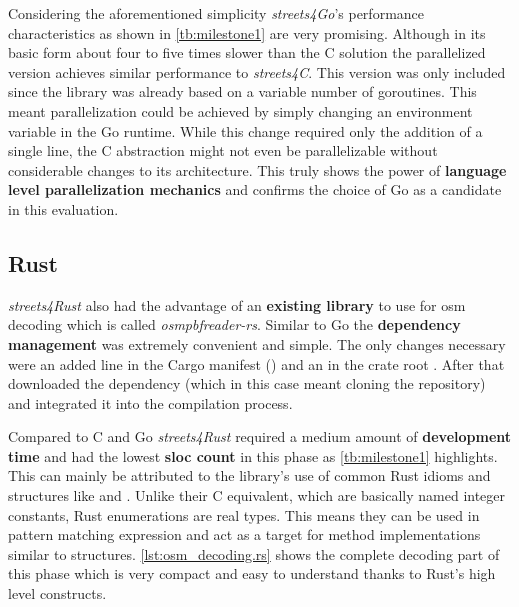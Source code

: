 Considering the aforementioned simplicity \textit{streets4Go}'s performance characteristics as shown in \autoref{tb:milestone1} are very promising. Although in its basic form about four to five times slower than the C solution the parallelized version achieves similar performance to \textit{streets4C}. This version was only included since the library was already based on a variable number of \glspl{goroutine}. This meant parallelization could be achieved by simply changing an environment variable in the Go runtime. While this change required only the addition of a single line, the C abstraction  might not even be parallelizable without considerable changes to its architecture. This truly shows the power of \textbf{language level parallelization mechanics} and confirms the choice of Go as a candidate in this evaluation.

\subsection{Rust}
\label{subsec:Implementation::Counting::Rust}

\textit{streets4Rust} also had the advantage of an \textbf{existing library} to use for \gls{osm} decoding which is called \textit{osmpbfreader-rs}. Similar to Go the \textbf{dependency management} was extremely convenient and simple. The only changes necessary were an added line in the Cargo manifest () and an  in the crate root . After that  downloaded the dependency (which in this case meant cloning the  repository) and integrated it into the compilation process.

Compared to C and Go \textit{streets4Rust} required a medium amount of \textbf{development time} and had the lowest \textbf{\gls{sloc} count} in this phase as \autoref{tb:milestone1} highlights. This can mainly be attributed to the library's use of common Rust idioms and structures like  and . Unlike their C equivalent, which are basically named integer constants, Rust enumerations are real types. This means they can be used in pattern matching expression and act as a target for method implementations similar to structures. \autoref{lst:osm_decoding.rs} shows the complete decoding part of this phase which is very compact and easy to understand thanks to Rust's high level constructs.
\\


